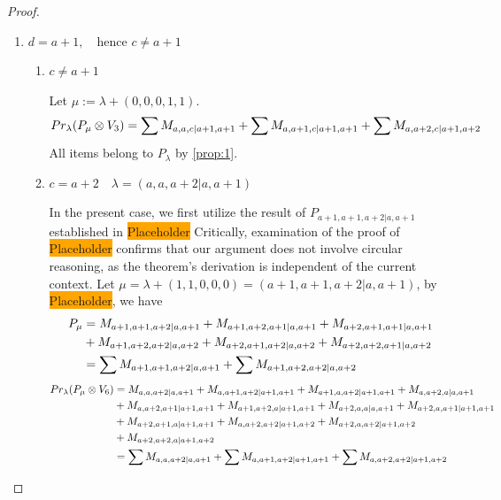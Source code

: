 \begin{proof}
\begin{enumerate}
\begin{enumerate}
\item $d = a+1,\quad \text{hence } c\neq a+1$ 
          \begin{enumerate}
            \item $c \neq a+1$ \par
        Let $\mu:=\lambda + (0,0,0,1,1) $.
        \begin{equation}\notag
          \begin{aligned}
            Pr_{\lambda}(P_\mu \otimes V_{3}) &=
\sum M_{a,a,c|a+1,a+1}
+ \sum M_{a,a+1,c|a+1,a+1}
+ \sum M_{a,a+2,c|a+1,a+2}
          \end{aligned}
        \end{equation}
All items belong to $P_\lambda$ by \cref{prop:1}.

            \item $c = a+2 \quad \lambda = (a,a,a+2|a,a+1)$  \par
        In the present case, we first utilize the result of $P_{a+1,a+1,a+2|a,a+1}$ established in \colorbox{orange}{Placeholder} Critically, examination of the proof of \colorbox{orange}{Placeholder} confirms that our argument does not involve circular reasoning, as the theorem's derivation is independent of the current context. Let $\mu = \lambda + (1,1,0,0,0) =(a+1,a+1,a+2|a,a+1) $, by \colorbox{orange}{Placeholder}, we have
        \begin{equation}\notag
          \begin{aligned}
            P_\mu &= 
M_{a+1,a+1,a+2|a,a+1}
+M_{a+1,a+2,a+1|a,a+1}
+M_{a+2,a+1,a+1|a,a+1}\\
                                               &
+M_{a+1,a+2,a+2|a,a+2}
+M_{a+2,a+1,a+2|a,a+2}
+M_{a+2,a+2,a+1|a,a+2} \\
                  &=
\sum M_{a+1,a+1,a+2|a,a+1}
+\sum M_{a+1,a+2,a+2|a,a+2}
          \end{aligned}
        \end{equation}
        \begin{equation}\notag
          \begin{aligned}
            Pr_{\lambda}(P_\mu \otimes V_{6}) &=
M_{a,a,a+2|a,a+1}
+ M_{a,a+1,a+2|a+1,a+1}
+ M_{a+1,a,a+2|a+1,a+1}
+ M_{a,a+2,a|a,a+1}\\
                                               &
+ M_{a,a+2,a+1|a+1,a+1}
+ M_{a+1,a+2,a|a+1,a+1}
+ M_{a+2,a,a|a,a+1}
+ M_{a+2,a,a+1|a+1,a+1}\\
                                               &
+ M_{a+2,a+1,a|a+1,a+1}
+ M_{a,a+2,a+2|a+1,a+2}
+ M_{a+2,a,a+2|a+1,a+2}\\
                                               &
+ M_{a+2,a+2,a|a+1,a+2} \\
                                               &=
\sum M_{a,a,a+2|a,a+1}
+ \sum M_{a,a+1,a+2|a+1,a+1}
+ \sum M_{a,a+2,a+2|a+1,a+2}
          \end{aligned}
        \end{equation}
          \end{enumerate}
      \end{enumerate}


\end{enumerate}
\end{proof}
